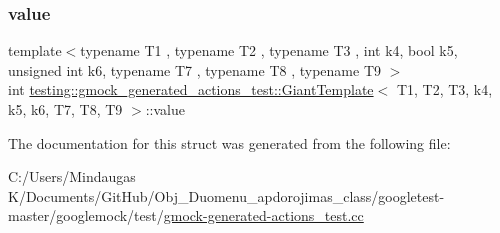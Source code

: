 \subsubsection{\texorpdfstring{value}{value}}
{\footnotesize\ttfamily template$<$typename T1 , typename T2 , typename T3 , int k4, bool k5, unsigned int k6, typename T7 , typename T8 , typename T9 $>$ \\
int \mbox{\hyperlink{structtesting_1_1gmock__generated__actions__test_1_1_giant_template}{testing\+::gmock\+\_\+generated\+\_\+actions\+\_\+test\+::\+Giant\+Template}}$<$ T1, T2, T3, k4, k5, k6, T7, T8, T9 $>$\+::value}



The documentation for this struct was generated from the following file\+:\begin{DoxyCompactItemize}
\item 
C\+:/\+Users/\+Mindaugas K/\+Documents/\+Git\+Hub/\+Obj\+\_\+\+Duomenu\+\_\+apdorojimas\+\_\+class/googletest-\/master/googlemock/test/\mbox{\hyperlink{googletest-master_2googlemock_2test_2gmock-generated-actions__test_8cc}{gmock-\/generated-\/actions\+\_\+test.\+cc}}\end{DoxyCompactItemize}
